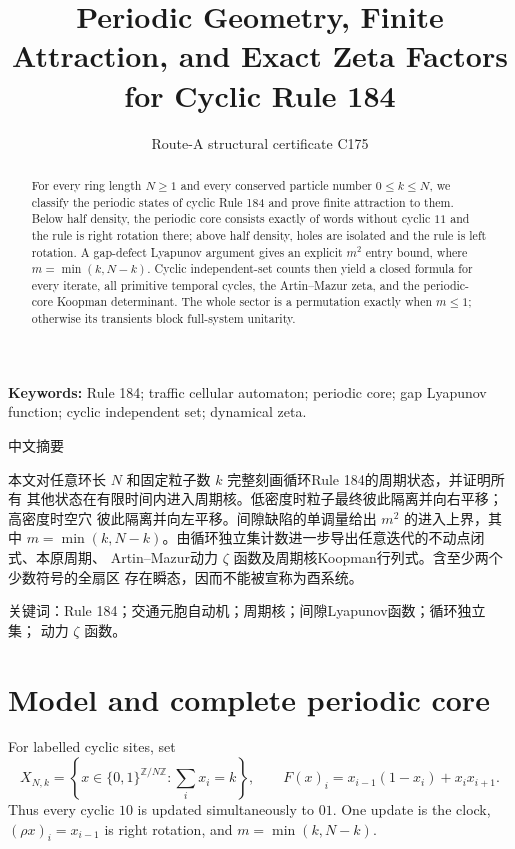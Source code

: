 \documentclass[10pt]{article}
\title{Periodic Geometry, Finite Attraction, and Exact Zeta Factors\\for Cyclic Rule 184}
\author{Route-A structural certificate C175}
\date{}
\begin{document}
\maketitle
\begin{abstract}
For every ring length $N\ge1$ and every conserved particle number
$0\le k\le N$, we classify the periodic states of cyclic Rule 184 and prove
finite attraction to them. Below half density, the periodic core consists
exactly of words without cyclic $11$ and the rule is right rotation there;
above half density, holes are isolated and the rule is left rotation. A
gap-defect Lyapunov argument gives an explicit $m^2$ entry bound, where
$m=\min(k,N-k)$. Cyclic independent-set counts then yield a closed formula
for every iterate, all primitive temporal cycles, the Artin--Mazur zeta, and
the periodic-core Koopman determinant. The whole sector is a permutation
exactly when $m\le1$; otherwise its transients block full-system unitarity.
\end{abstract}
\noindent\textbf{Keywords:} Rule 184; traffic cellular automaton; periodic
core; gap Lyapunov function; cyclic independent set; dynamical zeta.

\begin{otherlanguage}{chinese-simplified}
\begin{center}{\large 中文摘要}\end{center}
本文对任意环长 $N$ 和固定粒子数 $k$ 完整刻画循环\foreignlanguage{english}{Rule 184}的周期状态，并证明所有
其他状态在有限时间内进入周期核。低密度时粒子最终彼此隔离并向右平移；高密度时空穴
彼此隔离并向左平移。间隙缺陷的单调量给出 $m^2$ 的进入上界，其中
$m=\min(k,N-k)$。由循环独立集计数进一步导出任意迭代的不动点闭式、本原周期、
\foreignlanguage{english}{Artin--Mazur}动力 $\zeta$ 函数及周期核\foreignlanguage{english}{Koopman}行列式。含至少两个少数符号的全扇区
存在瞬态，因而不能被宣称为酉系统。

\noindent 关键词：\foreignlanguage{english}{Rule 184}；交通元胞自动机；周期核；间隙\foreignlanguage{english}{Lyapunov}函数；循环独立集；
动力 $\zeta$ 函数。
\end{otherlanguage}

\section{Model and complete periodic core}
For labelled cyclic sites, set
\[
X_{N,k}=\left\{x\in\{0,1\}^{\mathbb Z/N\mathbb Z}:
\sum_i x_i=k\right\},\qquad
F(x)_i=x_{i-1}(1-x_i)+x_ix_{i+1}.
\]
Thus every cyclic $10$ is updated simultaneously to $01$. One update is the
clock, $(\rho x)_i=x_{i-1}$ is right rotation, and
$m=\min(k,N-k)$.
\end{document}
